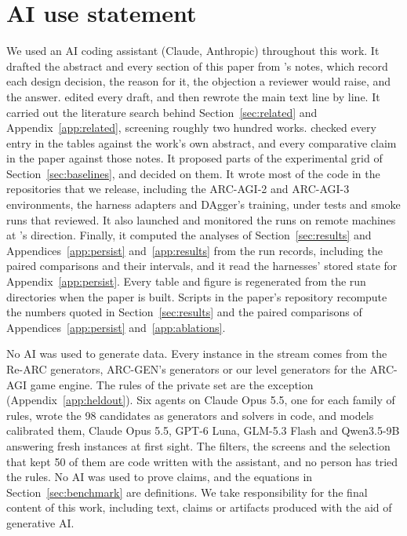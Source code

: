 \section*{AI use statement}
\label{sec:ai-use}


We used an AI coding assistant (Claude, Anthropic) throughout this work. It drafted the abstract and every section of this paper from \leadauthor's notes, which record each design decision, the reason for it, the objection a reviewer would raise, and the answer. \Leadauthor{} edited every draft, and then rewrote the main text line by line. It carried out the literature search behind Section~\ref{sec:related} and Appendix~\ref{app:related}, screening roughly two hundred works. \Leadauthor{} checked every entry in the tables against the work's own abstract, and every comparative claim in the paper against those notes. It proposed parts of the experimental grid of Section~\ref{sec:baselines}, and \leadauthor{} decided on them. It wrote most of the code in the repositories that we release, including the ARC-AGI-2 and ARC-AGI-3 environments, the harness adapters and DAgger's training, under tests and smoke runs that \leadauthor{} reviewed. It also launched and monitored the runs on remote machines at \leadauthor's direction. Finally, it computed the analyses of Section~\ref{sec:results} and Appendices~\ref{app:persist} and~\ref{app:results} from the run records, including the paired comparisons and their intervals, and it read the harnesses' stored state for Appendix~\ref{app:persist}. Every table and figure is regenerated from the run directories when the paper is built. Scripts in the paper's repository recompute the numbers quoted in Section~\ref{sec:results} and the paired comparisons of Appendices~\ref{app:persist} and~\ref{app:ablations}.

No AI was used to generate data. Every instance in the stream comes from the Re-ARC generators, ARC-GEN's generators or our level generators for the ARC-AGI game engine. The rules of the private set are the exception (Appendix~\ref{app:heldout}). Six agents on Claude Opus 5.5, one for each family of rules, wrote the 98 candidates as generators and solvers in code, and models calibrated them, Claude Opus 5.5, GPT-6 Luna, GLM-5.3 Flash and Qwen3.5-9B answering fresh instances at first sight. The filters, the screens and the selection that kept 50 of them are code written with the assistant, and no person has tried the rules. No AI was used to prove claims, and the equations in Section~\ref{sec:benchmark} are definitions. We take responsibility for the final content of this work, including text, claims or artifacts produced with the aid of generative AI.
